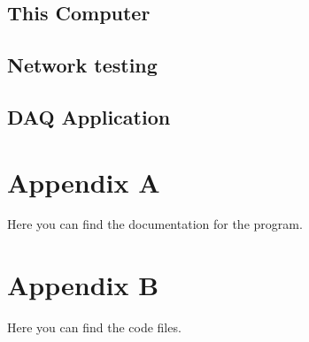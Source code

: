 \documentclass[11pt, A4paper, english]{article}
\begin{document}
		\subsection{This Computer}

		
		\subsection{Network testing}

		
		\subsection{DAQ Application}


\printbibliography
	
	\section{Appendix A}
Here you can find the documentation for the program. \\

	\section{Appendix B}
Here you can find the code files.
\end{document}
